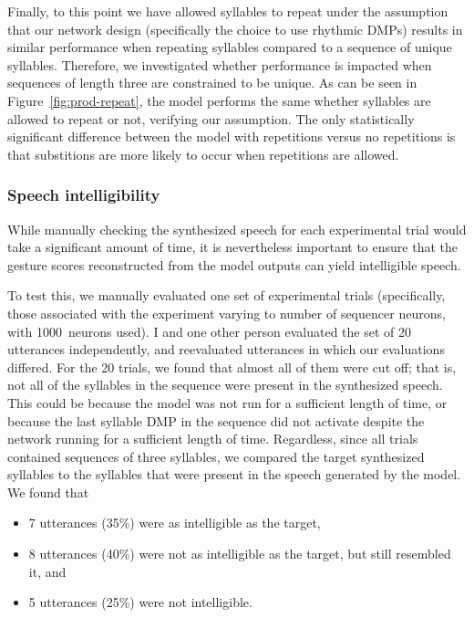 
Finally, to this point we have
allowed syllables to repeat
under the assumption that our network design
(specifically the choice to use rhythmic DMPs)
results in similar performance when
repeating syllables compared to
a sequence of unique syllables.
Therefore, we investigated whether
performance is impacted when
sequences of length three
are constrained to be unique.
As can be seen in Figure~\ref{fig:prod-repeat},
the model performs the same
whether syllables are allowed to repeat or not,
verifying our assumption.
The only statistically significant difference
between the model with repetitions
versus no repetitions
is that substitions are more likely
to occur when repetitions are allowed.

\subsubsection{Speech intelligibility}

While manually checking the synthesized speech
for each experimental trial
would take a significant amount of time,
it is nevertheless important
to ensure that the gesture scores
reconstructed from the model outputs
can yield intelligible speech.

To test this, we manually evaluated
one set of experimental trials
(specifically, those associated with
the experiment varying to number of
sequencer neurons,
with 1000~neurons used).
I and one other person evaluated
the set of 20 utterances independently,
and reevaluated utterances
in which our evaluations differed.
For the 20 trials,
we found that
almost all of them were cut off;
that is, not all of the syllables
in the sequence were present
in the synthesized speech.
This could be because the model
was not run for a sufficient length of time,
or because the last syllable DMP in the sequence
did not activate
despite the network running
for a sufficient length of time.
Regardless, since all trials
contained sequences of three syllables,
we compared the target synthesized syllables
to the syllables that were present
in the speech generated by the model.
We found that
\begin{itemize}
  \item 7 utterances (35\%) were as intelligible as the target,
  \item 8 utterances (40\%) were not as intelligible as the target,
    but still resembled it, and
  \item 5 utterances (25\%) were not intelligible.
\end{itemize}

